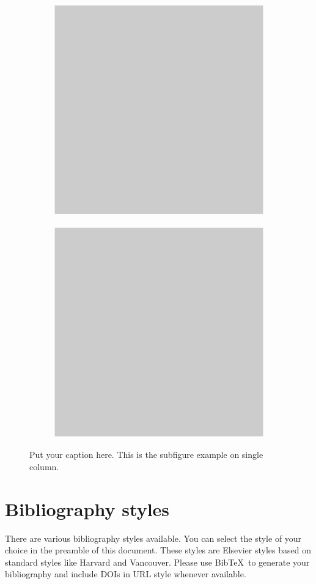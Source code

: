 \documentclass[a4paper,fleqn]{cas-dc}
\begin{document}
\begin{figure}[ht]
	\begin{subfigure}{.5\textwidth}
		\centering
		\includegraphics[width=.5\linewidth]{figs/Fig1.pdf}  
		\caption{}  					%
		\label{FIG:3a}
	\end{subfigure}
	\begin{subfigure}{.5\textwidth}
		\centering
		\includegraphics[width=.5\linewidth]{figs/Fig1.pdf}  
		\caption{} 						%
		\label{FIG:3b}
	\end{subfigure}
	\caption{Put your caption here. This is the subfigure example on single column.} 	%
	\label{FIG:3}
\end{figure}


\section{Bibliography styles}

There are various bibliography styles available. You can select the
style of your choice in the preamble of this document. These styles are
Elsevier styles based on standard styles like Harvard and Vancouver.
Please use Bib\TeX\ to generate your bibliography and include DOIs in URL
style whenever available.
\end{document}
